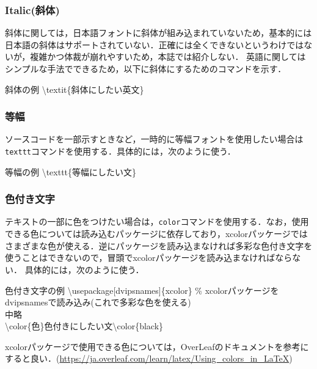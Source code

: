 \subsubsection{Italic(斜体)}
斜体に関しては，日本語フォントに斜体が組み込まれていないため，基本的には日本語の斜体はサポートされていない．正確には全くできないというわけではないが，複雑かつ体裁が崩れやすいため，本誌では紹介しない．
英語に関してはシンプルな手法でできるため，以下に斜体にするためのコマンドを示す．
\begin{itembox}[c]{斜体の例}
  \ttfamily
  \textbackslash textit\{斜体にしたい英文\}
\end{itembox}
\subsubsection{等幅}
ソースコードを一部示すときなど，一時的に等幅フォントを使用したい場合は\texttt{texttt}コマンドを使用する．具体的には，次のように使う．
\begin{itembox}[c]{等幅の例}
  \ttfamily
  \textbackslash texttt\{等幅にしたい文\}
\end{itembox}
\subsubsection{色付き文字}
テキストの一部に色をつけたい場合は，\texttt{color}コマンドを使用する．なお，使用できる色については読み込むパッケージに依存しており，xcolorパッケージではさまざまな色が使える．逆にパッケージを読み込まなければ多彩な色付き文字を使うことはできないので，冒頭でxcolorパッケージを読み込まなければならない．
具体的には，次のように使う．
\begin{itembox}[c]{色付き文字の例}
  \ttfamily
  \textbackslash usepackage[dvipsnames]\{xcolor\}
  \% xcolorパッケージをdvipsnamesで読み込み(これで多彩な色を使える)
  \\
  中略
  \\
  \textbackslash color\{色\}色付きにしたい文\textbackslash color\{black\}
\end{itembox}
xcolorパッケージで使用できる色については，OverLeafのドキュメントを参考にすると良い．(\url{https://ja.overleaf.com/learn/latex/Using_colors_in_LaTeX})